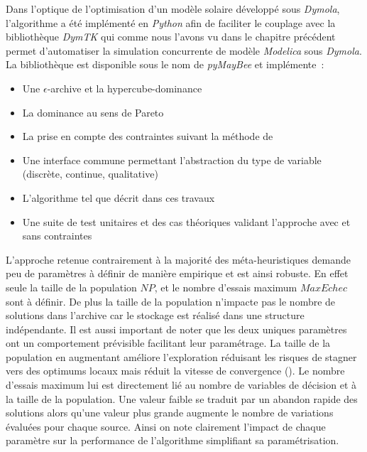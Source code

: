 Dans l’optique de l’optimisation d’un modèle solaire développé sous \textit{Dymola}, l’algorithme
a été implémenté en \textit{Python} afin de faciliter le couplage avec la bibliothèque
\textit{DymTK} qui comme nous l’avons vu dans le chapitre précédent permet d’automatiser
la simulation concurrente de modèle \textit{Modelica} sous \textit{Dymola}. La bibliothèque est
disponible sous le nom de \textit{pyMayBee} et implémente~:
\begin{itemize}
  \item Une $\epsilon$-archive et la hypercube-dominance
  \item La dominance au sens de Pareto
  \item La prise en compte des contraintes suivant la méthode de \textcite{Woldesenbet20073077}
  \item Une interface commune permettant l’abstraction du type de variable (discrète, continue, qualitative)
  \item L’algorithme tel que décrit dans ces travaux
  \item Une suite de test unitaires et des cas théoriques validant l’approche avec
        et sans contraintes
\end{itemize}

L’approche retenue contrairement à la majorité des méta-heuristiques demande
peu de paramètres à définir de manière empirique et est ainsi robuste. En effet
seule la taille de la population $NP$, et le nombre d’essais maximum $MaxEchec$ sont à définir.
De plus la taille de la population n’impacte pas le nombre de solutions dans l’archive
car le stockage est réalisé dans une structure indépendante. Il est aussi important
de noter que les deux uniques paramètres ont un comportement prévisible facilitant
leur paramétrage. La taille de la population en augmentant améliore l’exploration
réduisant les risques de stagner vers des optimums locaux mais réduit la vitesse
de convergence ().
Le nombre d’essais maximum lui est directement lié au nombre de variables de décision
et à la taille de la population. Une valeur faible se traduit par un abandon rapide
des solutions alors qu’une valeur plus grande augmente le nombre de variations évaluées
pour chaque source. Ainsi on note clairement l’impact de chaque paramètre sur la
performance de l’algorithme simplifiant sa paramétrisation.





